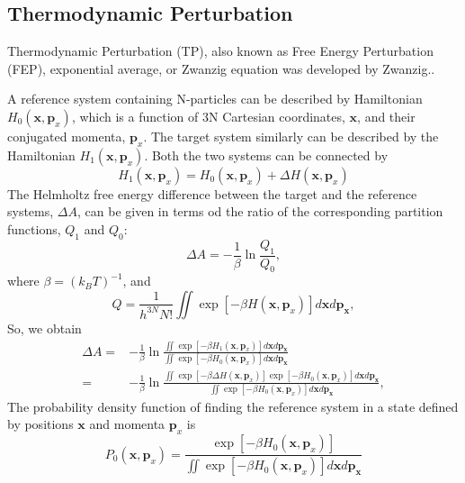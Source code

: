 \subsection{Thermodynamic Perturbation\label{Sec:FEM:TP}}
Thermodynamic Perturbation (TP), also known as Free Energy Perturbation (FEP), exponential average, or Zwanzig equation was developed by Zwanzig.\cite{ZwanzigJCP1954}. 

A reference system containing N-particles can be described by Hamiltonian $H_{0}(\textbf{x},\textbf{p}_{x})$, which is a function of 3N Cartesian coordinates, $\textbf{x}$, and their conjugated momenta, $\textbf{p}_{x}$. The target system similarly can be described by the Hamiltonian $H_{1}(\textbf{x},\textbf{p}_{x})$. Both the two systems can be connected by 
\begin{equation}
H_{1}(\textbf{x},\textbf{p}_{x}) = H_{0}(\textbf{x},\textbf{p}_{x}) + \Delta H (\textbf{x},\textbf{p}_{x})
\label{Eq:deltaH}
\end{equation}
The Helmholtz free energy difference between the target and the reference systems, $\Delta A$, can be given in terms od the ratio of the corresponding partition functions, $Q_{1}$ and $Q_{0}$:
\begin{equation}
\Delta A  =  -\frac{1}{\beta}\ln\frac{Q_{1}}{Q_{0}},
\label{Eq:deltaA}
\end{equation}
where $\beta = {(k_{B}T)}^{-1}$, and
\begin{equation}
Q = \frac{1}{{h}^{3N}N!} \iint \exp\left[-\beta H(\textbf{x},\textbf{p}_{x})\right] d\textbf{x}d\textbf{p}_\textbf{x},
\label{Eq:PF}
\end{equation}
So, we obtain
\begin{align}
\Delta A  =&  -\frac{1}{\beta}\ln{\frac{\iint \exp\left[-\beta H_{1}(\textbf{x},\textbf{p}_{x})\right] d\textbf{x}d\textbf{p}_\textbf{x}}{\iint \exp\left[-\beta H_{0}(\textbf{x},\textbf{p}_{x}) \right] d\textbf{x}d\textbf{p}_\textbf{x}}}\\
=& -\frac{1}{\beta}\ln{\frac{\iint \exp\left[-\beta \Delta H(\textbf{x},\textbf{p}_{x})\right] \exp\left[-\beta H_{0}(\textbf{x},\textbf{p}_{x})\right] d\textbf{x}d\textbf{p}_\textbf{x}}{\iint \exp\left[-\beta H_{0}(\textbf{x},\textbf{p}_{x})\right] d\textbf{x}d\textbf{p}_\textbf{x}}},
\label{Eq:deltaA2}
\end{align}
The probability density function of finding the reference system in a state defined by positions $\textbf{x}$ and momenta $\textbf{p}_{x}$ is 
\begin{equation}
P_{0}(\textbf{x},\textbf{p}_{x}) = \frac{ \exp[-\beta H_{0}(\textbf{x},\textbf{p}_{x}) ] }{\iint \exp[-\beta H_{0}(\textbf{x},\textbf{p}_{x}) ] d\textbf{x}d\textbf{p}_\textbf{x}}
\label{Eq:proden}
\end{equation}
